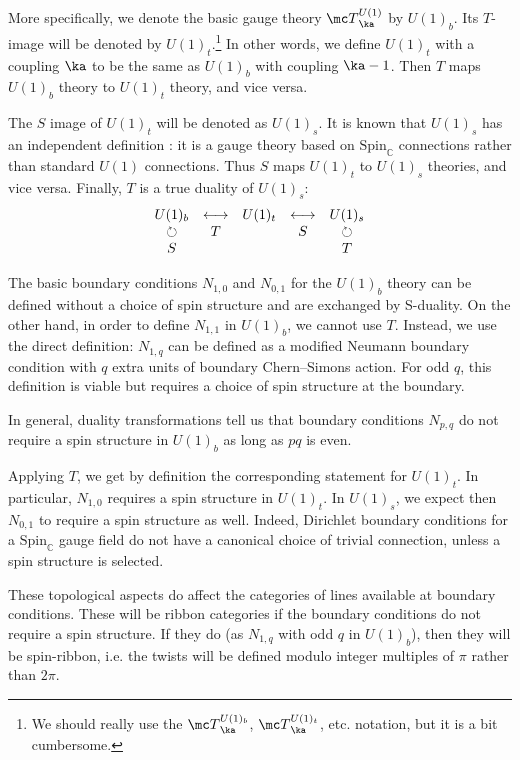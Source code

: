 \documentclass[11pt,reqno]{amsart}
\theoremstyle{plain}
\numberwithin{equation}{section}
\newcommand{\C}{\mathbb{C}}
\theoremstyle{definition}
\begin{document}
More specifically, we denote the basic gauge theory ${\mc
  T}^{U(1)}_\ka$ by $U(1)_b$. Its $T$-image will be denoted by
$U(1)_t$.\footnote{We should really use the ${\mc
  T}^{U(1)_b}_\ka$, ${\mc
  T}^{U(1)_t}_\ka$, etc. notation, but it is a bit cumbersome.}
  In other words, we define $U(1)_t$ with a coupling $\ka$
to be the same as $U(1)_b$ with coupling $\ka - 1$. Then $T$ maps
$U(1)_b$ theory to $U(1)_t$ theory, and vice versa.

The $S$ image of $U(1)_t$ will be denoted as $U(1)_s$. It is known that 
$U(1)_s$ has an independent definition \cite{M}: it is a gauge theory based on
$\mathrm{Spin}_\C$ connections rather than standard $U(1)$ connections. 
Thus $S$ maps $U(1)_t$ to $U(1)_s$ theories, and vice versa. Finally,
$T$ is a true duality of $U(1)_s$:
\begin{equation}
\begin{matrix} U(1)_b & \longleftrightarrow & U(1)_t &
  \longleftrightarrow & U(1)_s \cr \circlearrowright & T
  &&S&\circlearrowright
\cr S & &&& T\end{matrix}
\end{equation}

The basic boundary conditions $N_{1,0}$ and $N_{0,1}$ for the $U(1)_b$
theory can be defined without a choice of spin structure and are
exchanged by S-duality. On the other hand, in order to define
$N_{1,1}$ in $U(1)_b$, we cannot use $T$.  Instead, we use the direct
definition: $N_{1,q}$ can be defined as a modified Neumann boundary
condition with $q$ extra units of boundary Chern--Simons action. For
odd $q$, this definition is viable but requires a choice of spin
structure at the boundary.

In general, duality transformations tell us that boundary conditions
$N_{p,q}$ do not require a spin structure in $U(1)_b$ as long as $pq$
is even.

Applying $T$, we get by definition the corresponding statement for
$U(1)_t$. In particular, $N_{1,0}$ requires a spin structure in
$U(1)_t$. In $U(1)_s$, we expect then $N_{0,1}$ to require a spin
structure as well. Indeed, Dirichlet boundary conditions for a
$\mathrm{Spin}_\C$ gauge field do not have a canonical choice of
trivial connection, unless a spin structure is selected.

These topological aspects do affect the categories of lines available
at boundary conditions. These will be ribbon categories if the
boundary conditions do not require a spin structure. If they do (as
$N_{1,q}$ with odd $q$ in $U(1)_b$), then they will be spin-ribbon,
i.e. the twists will be defined modulo integer multiples of $\pi$
rather than $2\pi$.
\end{document}

